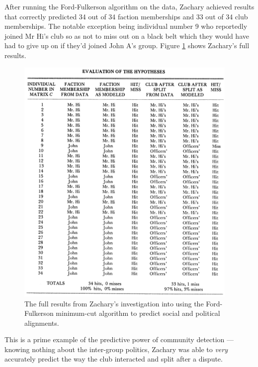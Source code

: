 After running the Ford-Fulkerson algorithm on the data, Zachary achieved results that correctly predicted 34 out of 34 faction memberships and 33 out of 34 club memberships. The notable exception being individual number 9 who reportedly joined Mr Hi's club so as not to miss out on a black belt which they would have had to give up on if they'd joined John A's group. Figure \ref{fig:zachary_results} shows Zachary's full results.

\begin{figure}
    \begin{center}
        \includegraphics[width=0.95\textwidth]{img/zachary_results}
    \end{center}
    \caption{The full results from Zachary's investigation into using the Ford-Fulkerson minimum-cut algorithm to predict social and political alignments.\cite{konect:ucidata-zachary}}
    \label{fig:zachary_results}
\end{figure}

This is a prime example of the predictive power of community detection --- knowing nothing about the inter-group politics, Zachary was able to \emph{very} accurately predict the way the club interacted and split after a dispute.

